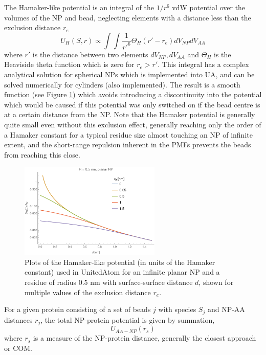 \documentclass[10pt,a4paper,onecolumn]{report}
\begin{document}
  The Hamaker-like potential is an integral of the $1/r^6$ vdW potential over the volumes of the NP and bead, neglecting elements with a distance less than the exclusion distance $r_e$
 \begin{equation}
 U_H(S,r) \propto \int \int \frac{1}{r'^6} \Theta_H( r' - r_e)dV_{NP} dV_{AA}
 \end{equation}
 where $r'$ is the distance between two elements $dV_{NP}, dV_{AA}$ and $\Theta_H$ is the Heaviside theta function which is zero for $r_e > r'$. This integral has a complex analytical solution for spherical NPs which is implemented into UA, and can be solved numerically for cylinders (also implemented). The result is a smooth function (see Figure \ref{fig:hamaker-exclusion}) which avoids introducing a discontinuity into the potential which would be caused if this potential was only switched on if the bead centre is at a certain distance from the NP. Note that the Hamaker potential is generally quite small even without this exclusion effect, generally reaching only the order of a Hamaker constant for a typical residue size almost touching an NP of infinite extent, and the short-range repulsion inherent in the PMFs prevents the beads from reaching this close. 
 
 
\begin{figure} \label{fig:hamaker-exclusion}
    \centering
    \includegraphics[width=0.6\textwidth]{figures/hamaker_magnitude_perresidue.pdf}
    \caption{Plots of the Hamaker-like potential (in units of the Hamaker constant) used in UnitedAtom for an infinite planar NP and a residue of radius $0.5$ nm with surface-surface distance $d$, shown for multiple values of the exclusion distance $r_e$.}
\end{figure}
 
 
 
 
For a given protein consisting of a set of beads $j$ with species $S_j$ and NP-AA distances $r_j$, the total NP-protein potential is given by summation,
\begin{equation}
U_{AA-NP}(r_s)
\end{equation}
 where $r_s$ is a measure of the NP-protein distance, generally the closest approach or COM. 
 
\end{document}
